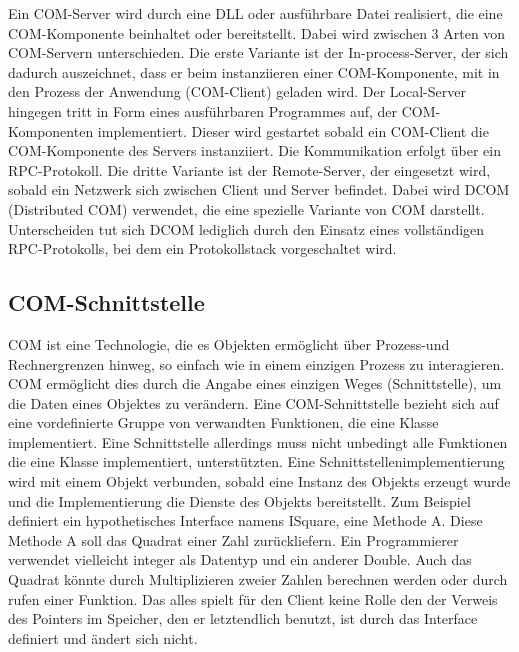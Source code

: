 Ein COM-Server wird durch eine DLL oder ausführbare Datei realisiert, die eine COM-Komponente beinhaltet oder bereitstellt. Dabei wird zwischen 3 Arten von COM-Servern unterschieden. Die erste Variante ist der In-process-Server, der sich dadurch auszeichnet, dass er beim instanziieren einer COM-Komponente, mit in den Prozess der Anwendung (COM-Client) geladen wird. Der Local-Server hingegen tritt in Form eines ausführbaren Programmes auf, der COM-Komponenten implementiert. Dieser wird gestartet sobald ein COM-Client die COM-Komponente des Servers instanziiert. Die Kommunikation erfolgt über ein RPC-Protokoll. Die dritte Variante ist der Remote-Server, der eingesetzt wird, sobald ein Netzwerk sich zwischen Client und Server befindet. Dabei wird DCOM (Distributed COM) verwendet, die eine spezielle Variante von COM darstellt. Unterscheiden tut sich DCOM lediglich durch den Einsatz eines vollständigen RPC-Protokolls, bei dem ein Protokollstack vorgeschaltet wird. 
 
\subsection{COM-Schnittstelle}
\label{ch:grundlagen:sec:ComponentObjectModel:subsec:COMSchnittstelle}

COM ist eine Technologie, die es Objekten ermöglicht über Prozess-und Rechnergrenzen hinweg, so einfach wie in einem einzigen Prozess zu interagieren. COM ermöglicht dies durch die Angabe eines einzigen Weges (Schnittstelle), um die Daten eines Objektes zu verändern. Eine COM-Schnittstelle bezieht sich auf eine vordefinierte Gruppe von verwandten Funktionen, die eine Klasse implementiert. Eine Schnittstelle allerdings muss nicht unbedingt alle Funktionen die eine Klasse implementiert, unterstützten. Eine Schnittstellenimplementierung wird mit einem Objekt verbunden, sobald eine Instanz des Objekts erzeugt wurde und die Implementierung die Dienste des Objekts bereitstellt. Zum Beispiel definiert ein hypothetisches Interface namens ISquare, eine Methode A. Diese Methode A soll das Quadrat einer Zahl zurückliefern. Ein Programmierer verwendet vielleicht integer als Datentyp und ein anderer Double. Auch das Quadrat könnte durch Multiplizieren zweier Zahlen berechnen werden oder durch rufen einer Funktion. Das alles spielt für den Client keine Rolle den der Verweis des Pointers im Speicher, den er letztendlich benutzt, ist durch das Interface definiert und ändert sich nicht. 

